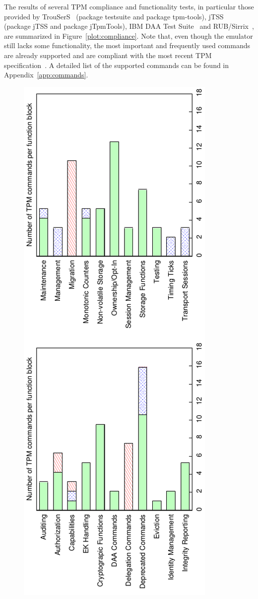 \documentclass[runningheads]{llncs}
\begin{document}
The results of several TPM compliance and functionality tests, in particular
those provided by TrouSerS~\cite{trousers} (package testsuite and package
tpm-tools), jTSS~\cite{jTSS} (package jTSS and package jTpmTools),
IBM DAA Test Suite~\cite{ibmdaatest} and
RUB/Sirrix~\cite{Sadeghi}, are summarized in Figure~\ref{plot:compliance}.
Note that, even though the emulator still lacks some functionality,
the most important and frequently used commands are already supported and
are compliant with the most recent TPM specification~\cite{TPM}.
A detailed list of the supported commands can be found in
Appendix~\ref{app:commands}.

\begin{figure}
	\begin{center}
		\includegraphics[angle=-90,scale=0.6]{plots/compliance}

\end{center}
\end{figure}
\end{document}
